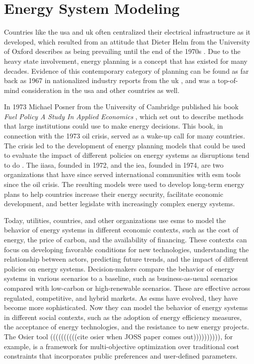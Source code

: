 \section{Energy System Modeling}
\label{sec:esm}

Countries like the \gls{usa} and \gls{uk} often centralized their electrical
infrastructure as it developed, which resulted from an attitude that Dieter
Helm from the University of Oxford describes as being prevailing until the end
of the 1970s \cite{helm_energy_2002}. Due to the heavy state involvement,
energy planning is a concept that has existed for many decades. Evidence of
this contemporary category of planning can be found as far back as 1967 in
nationalized industry reports from the \gls{uk}
\cite{treasury_nationalised_1967}, and was a top-of-mind consideration in the
\gls{usa} and other countries as well.

In 1973 Michael Posner from the University of Cambridge published his book
\textit{Fuel Policy A Study In Applied Economics} \cite{posner_fuel_1973},
which set out to describe methods that large institutions could use to make
energy decisions. This book, in connection with the 1973 oil crisis, served as
a wake-up call for many countries. The crisis led to the development of energy
planning models that could be used to evaluate the impact of different policies
on energy systems as disruptions tend to do \cite{plazas_disrupt_2022}. The
\gls{iiasa}, founded in 1972, and the \gls{iea}, founded in 1974, are two
organizations that have since served international communities with \gls{esm}
tools since the oil crisis. The resulting models were used to develop long-term
energy plans to help countries increase their energy security, facilitate
economic development, and better legislate with increasingly complex energy
systems.

Today, utilities, countries, and other organizations use \glspl{esm} to model
the behavior of energy systems in different economic contexts, such as the cost
of energy, the price of carbon, and the availability of financing. These
contexts can focus on developing favorable conditions for new technologies,
understanding the relationship between actors, predicting future trends, and
the impact of different policies on energy systems. Decision-makers compare the
behavior of energy systems in various scenarios to a baseline, such as
business-as-usual scenarios compared with low-carbon or high-renewable
scenarios. These are effective across regulated, competitive, and hybrid
markets. As \glspl{esm} have evolved, they have become more sophisticated. Now
they can model the behavior of energy systems in different social contexts,
such as the adoption of energy efficiency measures, the acceptance of energy
technologies, and the resistance to new energy projects. The Osier tool
((((((((((cite osier when JOSS paper comes out)))))))))), for example, is a
framework for multi-objective optimization over traditional cost constraints
that incorporates public preferences and user-defined parameters.

